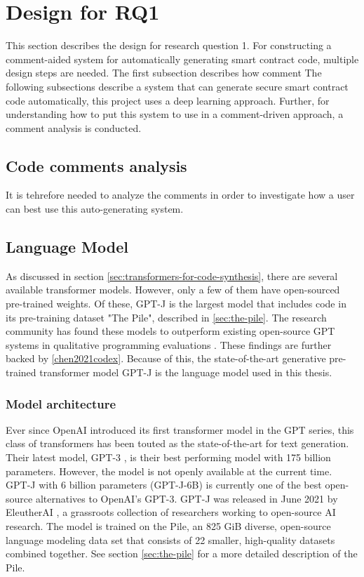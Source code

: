 \section{Design for RQ1}
\label{sec:design-for-rq1}
This section describes the design for research question 1. For constructing a comment-aided system for automatically generating smart contract code, multiple design steps are needed. The first subsection describes how comment The following subsections describe a system that can generate secure smart contract code automatically, this project uses a deep learning approach. Further, for understanding how to put this system to use in a comment-driven approach, a comment analysis is conducted.

\subsection{Code comments analysis}
\label{sec:code-comments-analysis}
It is tehrefore needed to analyze the comments in order to investigate how a user can best use this auto-generating system.

\subsection{Language Model}
\label{sec:language-model}
As discussed in section \cref{sec:transformers-for-code-synthesis}, there are several available transformer models. However, only a few of them have open-sourced pre-trained weights. Of these, GPT-J \cite{gpt-j} is the largest model that includes code in its pre-training dataset "The Pile", described in \cref{sec:the-pile}. The research community has found these models to outperform existing open-source GPT systems in qualitative programming evaluations \cite{wolf2021}. These findings are further backed by \cref{chen2021codex}. Because of this, the state-of-the-art generative pre-trained transformer model GPT-J is the language model used in this thesis.

\subsubsection{Model architecture}
\label{sec:architecture}
Ever since OpenAI introduced its first transformer model in the GPT series, this class of transformers has been touted as the state-of-the-art for text generation. Their latest model, GPT-3 \cite{brown2020language}, is their best performing model with 175 billion parameters. However, the model is not openly available at the current time. GPT-J \cite{gpt-j} with 6 billion parameters (GPT-J-6B) is currently one of the best open-source alternatives to OpenAI's GPT-3. GPT-J was released in June 2021 by EleutherAI \cite{elutherai}, a grassroots collection of researchers working to open-source AI research. The model is trained on the Pile, an 825 GiB diverse, open-source language modeling data set that consists of 22 smaller, high-quality datasets combined together. See section \cref{sec:the-pile} for a more detailed description of the Pile.

